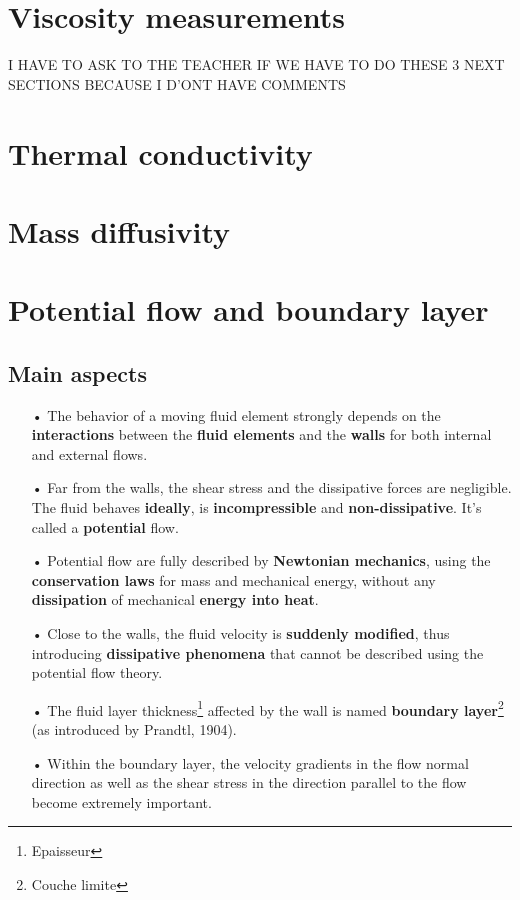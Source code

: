\section{Viscosity measurements}
I HAVE TO ASK TO THE TEACHER IF WE HAVE TO DO THESE 3 NEXT SECTIONS BECAUSE I D'ONT HAVE COMMENTS
	
\section{Thermal conductivity}
\section{Mass diffusivity}

\section{Potential flow and boundary layer}
\subsection{Main aspects}
\begin{itemize}
	\item[•] The behavior of a moving fluid element strongly depends on the \textbf{interactions} between the \textbf{fluid elements} and the \textbf{walls} for both internal and external flows. \\
	      	
	\item[•] Far from the walls, the shear stress and the dissipative forces are negligible. The fluid behaves \textbf{ideally}, is \textbf{incompressible} and \textbf{non-dissipative}. It's called a \textbf{potential} flow. \\
	      	
	\item[•] Potential flow are fully described by \textbf{Newtonian mechanics}, using the \textbf{conservation laws} for mass and mechanical energy, without any \textbf{dissipation} of mechanical \textbf{energy into heat}. \\
	      	
	\item[•] Close to the walls, the fluid velocity is \textbf{suddenly modified}, thus introducing \textbf{dissipative phenomena} that cannot be described using the potential flow theory.
	      	
	\item[•] The fluid layer thickness\footnote{Epaisseur} affected by the wall is named \textbf{boundary layer}\footnote{Couche limite} (as introduced by Prandtl, 1904).\\
	      	
	\item[•] Within the boundary layer, the velocity gradients in the flow normal direction as well as the shear stress in the direction parallel to the flow become extremely important.
\end{itemize}
	
